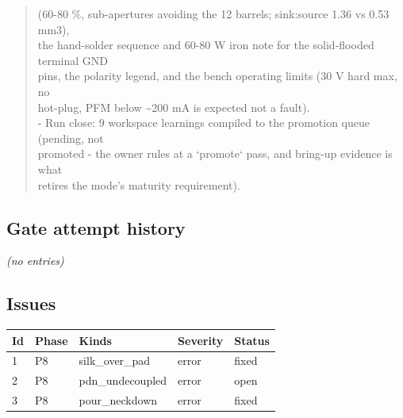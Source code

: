 \documentclass[11pt,a4paper]{article}
\begin{document}
\begin{quote}
  (60-80 \%, sub-apertures avoiding the 12 barrels; sink:source 1.36 vs 0.53 mm3),\\
  the hand-solder sequence and 60-80 W iron note for the solid-flooded terminal GND\\
  pins, the polarity legend, and the bench operating limits (30 V hard max, no\\
  hot-plug, PFM below \textasciitilde{}200 mA is expected not a fault).\\
- Run close: 9 workspace learnings compiled to the promotion queue (pending, not\\
  promoted - the owner rules at a `promote` pass, and bring-up evidence is what\\
  retires the mode's maturity requirement).
\end{quote}
\subsection*{Gate attempt history}
\emph{(no entries)}
\subsection*{Issues}
{\small
\begin{longtable}{llp{5cm}ll}
\toprule
\textbf{Id} & \textbf{Phase} & \textbf{Kinds} & \textbf{Severity} & \textbf{Status} \\
\midrule
\endhead
1 & P8 & silk\_over\_pad & error & fixed \\
2 & P8 & pdn\_undecoupled & error & open \\
3 & P8 & pour\_neckdown & error & fixed \\
\bottomrule
\end{longtable}
}
\end{document}
